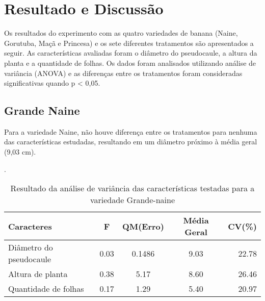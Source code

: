 \chapter{Resultado e Discussão}

Os resultados do experimento com as quatro variedades de banana (Naine, Gorutuba, Maçã e Princesa) e os sete diferentes tratamentos são apresentados a seguir. As características avaliadas foram o diâmetro do pseudocaule, a altura da planta e a quantidade de folhas. Os dados foram analisados utilizando análise de variância (ANOVA) e as diferenças entre os tratamentos foram consideradas significativas quando p < 0,05.
\section{Grande Naine}

Para a variedade Naine, não houve diferença entre os tratamentos para nenhuma das características estudadas, resultando em um diâmetro próximo à média geral (9,03 cm). 

\begin{table}[!htb]
 	\begin{center}
 		\caption{Resultado da análise de variância das características testadas para a variedade Grande-naine}.
	 	\begin{tabular*}{\textwidth}{@{\extracolsep{\fill}}lcccr}
 		\toprule
 		\toprule
 		\textbf{Caracteres} & \textbf{F}  & \textbf{QM(Erro)} & \textbf{Média Geral} &\textbf {CV(\%)} \\
		\hline
		Diâmetro do pseudocaule & 0.03 & 0.1486 & 9.03 &  22.78 \\
		Altura de planta &0.38 &5.17 & 8.60 &26.46 \\
		Quantidade de folhas &0.17  &1.29 &5.40 & 20.97\\
		\hline
		\hline
 		\end{tabular*}\\
 	\end{center}
\end{table}